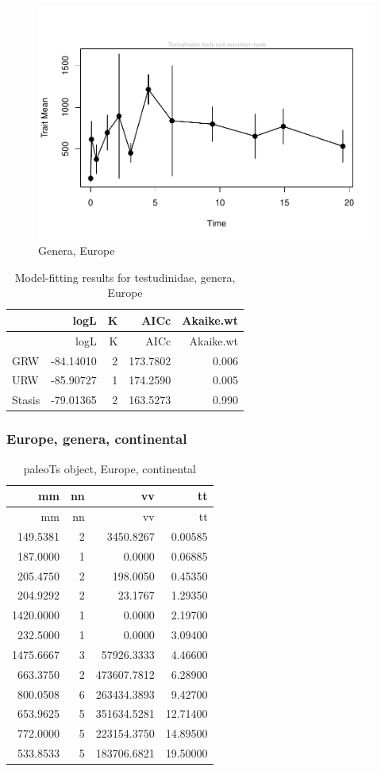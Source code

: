 \begin{figure}[H]
	\centering
	\includegraphics{MA_JJ_files/figure-latex/paleoTSEurope-1.pdf}
	\caption{Genera, Europe}
	\label{fig:pTSEu}
\end{figure}

\begin{longtable}[]{@{}lrrrr@{}}
	\caption{Model-fitting results for testudinidae, genera,
		Europe}
	\label{tab:pTSEuEM}\tabularnewline
	\toprule
	& logL & K & AICc & Akaike.wt\tabularnewline
	\midrule
	\endfirsthead
	\toprule
	& logL & K & AICc & Akaike.wt\tabularnewline
	\midrule
	\endhead
	GRW & -84.14010 & 2 & 173.7802 & 0.006\tabularnewline
	URW & -85.90727 & 1 & 174.2590 & 0.005\tabularnewline
	Stasis & -79.01365 & 2 & 163.5273 & 0.990\tabularnewline
	\bottomrule
\end{longtable}

\FloatBarrier

\subsubsection{Europe, genera, continental}\label{europe-genera-continental}

\begin{longtable}[]{@{}rrrr@{}}
	\caption{paleoTs object, Europe, continental}
	\label{tab:pTSEuC}\tabularnewline
	\toprule
	mm & nn & vv & tt\tabularnewline
	\midrule
	\endfirsthead
	\toprule
	mm & nn & vv & tt\tabularnewline
	\midrule
	\endhead
	149.5381 & 2 & 3450.8267 & 0.00585\tabularnewline
	187.0000 & 1 & 0.0000 & 0.06885\tabularnewline
	205.4750 & 2 & 198.0050 & 0.45350\tabularnewline
	204.9292 & 2 & 23.1767 & 1.29350\tabularnewline
	1420.0000 & 1 & 0.0000 & 2.19700\tabularnewline
	232.5000 & 1 & 0.0000 & 3.09400\tabularnewline
	1475.6667 & 3 & 57926.3333 & 4.46600\tabularnewline
	663.3750 & 2 & 473607.7812 & 6.28900\tabularnewline
	800.0508 & 6 & 263434.3893 & 9.42700\tabularnewline
	653.9625 & 5 & 351634.5281 & 12.71400\tabularnewline
	772.0000 & 5 & 223154.3750 & 14.89500\tabularnewline
	533.8533 & 5 & 183706.6821 & 19.50000\tabularnewline
	\bottomrule
\end{longtable}

